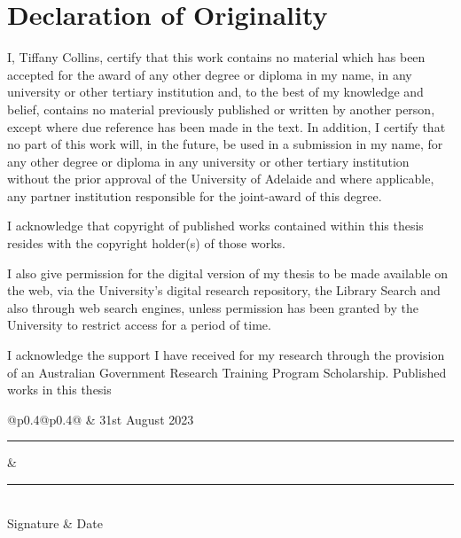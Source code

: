 \chapter{Declaration of Originality}

I, Tiffany Collins, certify that this work contains no material which has been accepted for the award of any other degree or diploma in my name, in any university or other tertiary institution and, to the best of my knowledge and belief, contains no material previously published or written by another person, except where due reference has been made in the text. In addition, I certify that no part of this work will, in the future, be used in a submission in my name, for any other degree or diploma in any university or other tertiary institution without the prior approval of the University of Adelaide and where applicable, any partner institution responsible for the joint-award of this degree.
\par
\noindent I acknowledge that copyright of published works contained within this thesis resides with the copyright holder(s) of those works.
\par
\noindent I also give permission for the digital version of my thesis to be made available on the web, via the University’s digital research
repository, the Library Search and also through web search engines, unless permission has been granted by the University to restrict access for a period of time.
\par
\noindent I acknowledge the support I have received for my research through the provision of an Australian Government Research Training
Program Scholarship.
\newpar
\noindent Published works in this thesis
\newpar
\noindent {}








\vspace{4.0cm}

\begin{tabular}{@{}p{0.4\textwidth}@{\hspace{0.15\textwidth}}p{0.4\textwidth}@{}}
	 & 31st August 2023 \\
	\rule{\linewidth}{0.25pt} & \rule{\linewidth}{0.25pt} \\
	Signature & Date
\end{tabular}